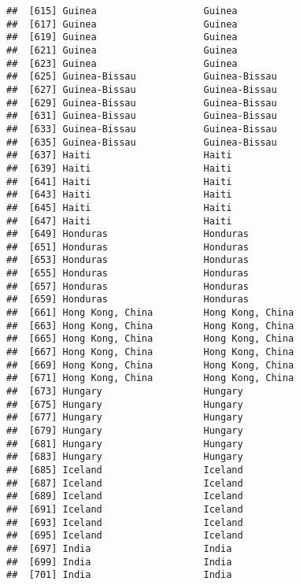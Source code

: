 \documentclass[]{article}
\begin{document}
\begin{verbatim}
##  [615] Guinea                   Guinea                  
##  [617] Guinea                   Guinea                  
##  [619] Guinea                   Guinea                  
##  [621] Guinea                   Guinea                  
##  [623] Guinea                   Guinea                  
##  [625] Guinea-Bissau            Guinea-Bissau           
##  [627] Guinea-Bissau            Guinea-Bissau           
##  [629] Guinea-Bissau            Guinea-Bissau           
##  [631] Guinea-Bissau            Guinea-Bissau           
##  [633] Guinea-Bissau            Guinea-Bissau           
##  [635] Guinea-Bissau            Guinea-Bissau           
##  [637] Haiti                    Haiti                   
##  [639] Haiti                    Haiti                   
##  [641] Haiti                    Haiti                   
##  [643] Haiti                    Haiti                   
##  [645] Haiti                    Haiti                   
##  [647] Haiti                    Haiti                   
##  [649] Honduras                 Honduras                
##  [651] Honduras                 Honduras                
##  [653] Honduras                 Honduras                
##  [655] Honduras                 Honduras                
##  [657] Honduras                 Honduras                
##  [659] Honduras                 Honduras                
##  [661] Hong Kong, China         Hong Kong, China        
##  [663] Hong Kong, China         Hong Kong, China        
##  [665] Hong Kong, China         Hong Kong, China        
##  [667] Hong Kong, China         Hong Kong, China        
##  [669] Hong Kong, China         Hong Kong, China        
##  [671] Hong Kong, China         Hong Kong, China        
##  [673] Hungary                  Hungary                 
##  [675] Hungary                  Hungary                 
##  [677] Hungary                  Hungary                 
##  [679] Hungary                  Hungary                 
##  [681] Hungary                  Hungary                 
##  [683] Hungary                  Hungary                 
##  [685] Iceland                  Iceland                 
##  [687] Iceland                  Iceland                 
##  [689] Iceland                  Iceland                 
##  [691] Iceland                  Iceland                 
##  [693] Iceland                  Iceland                 
##  [695] Iceland                  Iceland                 
##  [697] India                    India                   
##  [699] India                    India                   
##  [701] India                    India                   

\end{verbatim}
\end{document}
